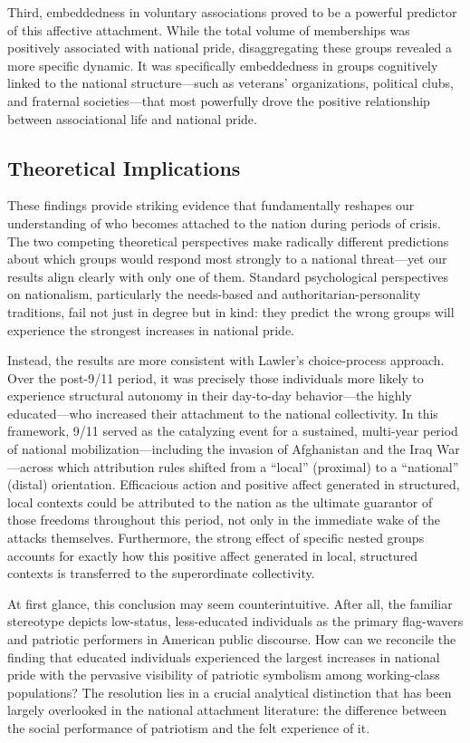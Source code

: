 \documentclass[12pt,letterpaper]{article}
\begin{document}
Third, embeddedness in voluntary associations proved to be a powerful predictor of this affective attachment. While the total volume of memberships was positively associated with national pride, disaggregating these groups revealed a more specific dynamic. It was specifically embeddedness in groups cognitively linked to the national structure---such as veterans' organizations, political clubs, and fraternal societies---that most powerfully drove the positive relationship between associational life and national pride. 

\subsection{Theoretical Implications}
These findings provide striking evidence that fundamentally reshapes our understanding of who becomes attached to the nation during periods of crisis. The two competing theoretical perspectives make radically different predictions about which groups would respond most strongly to a national threat---yet our results align clearly with only one of them. Standard psychological perspectives on nationalism, particularly the needs-based and authoritarian-personality traditions, fail not just in degree but in kind: they predict the wrong groups will experience the strongest increases in national pride. 

Instead, the results are more consistent with Lawler's \citeyearpar{lawler1992affective-8c8} choice-process approach. Over the post-9/11 period, it was precisely those individuals more likely to experience structural autonomy in their day-to-day behavior---the highly educated---who increased their attachment to the national collectivity. In this framework, 9/11 served as the catalyzing event for a sustained, multi-year period of national mobilization---including the invasion of Afghanistan and the Iraq War---across which attribution rules shifted from a ``local'' (proximal) to a ``national'' (distal) orientation. Efficacious action and positive affect generated in structured, local contexts could be attributed to the nation as the ultimate guarantor of those freedoms throughout this period, not only in the immediate wake of the attacks themselves. Furthermore, the strong effect of specific nested groups accounts for exactly how this positive affect generated in local, structured contexts is transferred to the superordinate collectivity.

At first glance, this conclusion may seem counterintuitive. After all, the familiar stereotype depicts low-status, less-educated individuals as the primary flag-wavers and patriotic performers in American public discourse. How can we reconcile the finding that educated individuals experienced the largest increases in national pride with the pervasive visibility of patriotic symbolism among working-class populations? The resolution lies in a crucial analytical distinction that has been largely overlooked in the national attachment literature: the difference between the social performance of patriotism and the felt experience of it.
\end{document}
